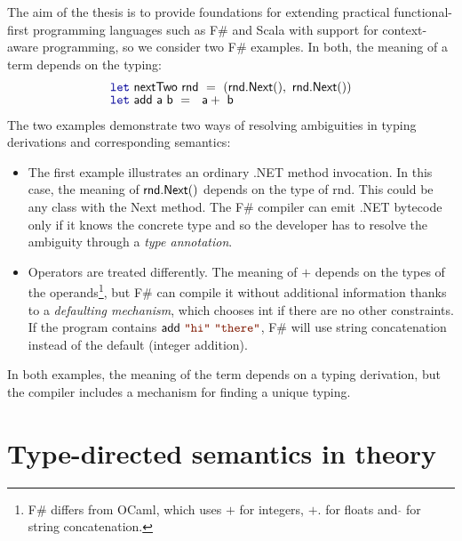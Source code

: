 \documentclass[
		twoside,openright,titlepage,numbers=noenddot,headinclude,%
                footinclude=true,cleardoublepage=empty,
                BCOR=10mm,paper=a4,fontsize=10pt, %
                ngerman,american, %
                ]{scrreprt}
\newcommand{\kvd}[1]{\textnormal{\textcolor{kvdclr}{\ttfamily #1}}}
\newcommand{\str}[1]{\textnormal{\textcolor{strclr}{\ttfamily "#1"}}}
\newcommand{\ident}[1]{\textnormal{\sffamily #1}}
\begin{document}
The aim of the thesis is to provide foundations for extending practical functional-first
programming languages such as F\# \cite{app-fsharp-spec} and Scala \cite{app-scala-spec} with
support for context-aware programming, so we consider two F\# examples. In both, the meaning of
a term depends on the typing:
%
\begin{equation*}
\begin{array}{l}
  \kvd{let}~\ident{nextTwo}~\ident{rnd}~=~(\ident{rnd.Next}(), \ident{rnd.Next}()) \\[-0.2em]
  \kvd{let}~\ident{add}~\ident{a}~\ident{b}~=~\ident{a}+\ident{b}
\end{array}
\end{equation*}
%
The two examples demonstrate two ways of resolving ambiguities in typing derivations and
corresponding semantics:

\begin{itemize}
\item The first example illustrates an ordinary .NET method invocation. In this case,
  the meaning of $\ident{rnd.Next}()$ depends on the type of \ident{rnd}. This could be any
  class with the \ident{Next} method. The F\# compiler can emit .NET bytecode only if it knows the
  concrete type and so the developer has to resolve the ambiguity through a \emph{type annotation}.

\item Operators are treated differently. The meaning of $+$ depends on the types of the
  operands\footnote{F\# differs from OCaml, which uses $+$ for integers, $+.$ for floats and
  $\hat{}$ for string concatenation.}, but F\# can compile it without additional information thanks
  to a \emph{defaulting mechanism}, which chooses \ident{int} if there are no other constraints.
  If the program contains $\ident{add}~\str{hi}~\str{there}$, F\# will use string concatenation
  instead of the default (integer addition).
\end{itemize}

\noindent
In both examples, the meaning of the term depends on a typing derivation, but the compiler includes
a mechanism for finding a unique typing.

\section{Type-directed semantics in theory}
\label{sec:background-theory}
\vspace{-1em}
\end{document}
